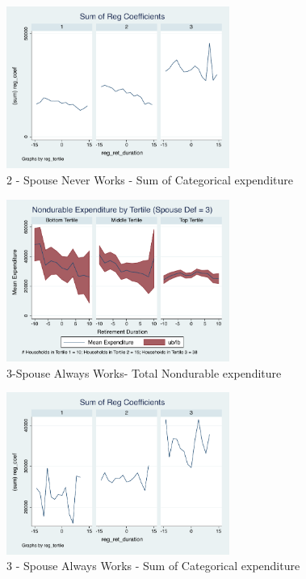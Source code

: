 \documentclass[11pt,onecolumn]{article}
\numberwithin{figure}{section}
\begin{document}
\begin{figure}[h]
	\caption{2 - Spouse Never Works - Sum of Categorical expenditure}
	\centering
	\includegraphics[width=0.65\textwidth]{../ConsumptionPostRetirement_by_SpouseDef_Cats/SumCoef/spouse_def_2.pdf}
\end{figure}

\clearpage

\begin{figure}[h]
	\caption{3-Spouse Always Works- Total Nondurable expenditure}
	\centering
	\includegraphics[width=0.65\textwidth]{../ConsumptionPostRetirement_by_SpouseDef/UnSmoothed/spouse_def_3.pdf}
\end{figure}

\begin{figure}[h]
	\caption{3 - Spouse Always Works - Sum of Categorical expenditure}
	\centering
	\includegraphics[width=0.65\textwidth]{../ConsumptionPostRetirement_by_SpouseDef_Cats/SumCoef/spouse_def_3.pdf}
\end{figure}
\end{document}
